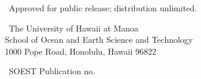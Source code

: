 \begin{titlepage}
    	\vspace{1cm}
    	
        {\normalsize \ Approved for public release; distribution unlimited. \par}
    
        \vspace{1.5cm}
        
        {\normalsize \ The University of Hawaii at Manoa \\
        School of Ocean and Earth Science and Technology \\
        1000 Pope Road, Honolulu, Hawaii 96822\par}
        \vspace{1cm}
        
    	{\large\ SOEST Publication no.  \par} 
    	
    	\vspace{0.25cm}

\end{titlepage}

